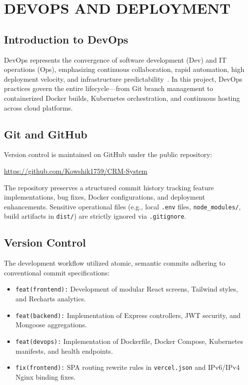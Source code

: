 \chapter{DEVOPS AND DEPLOYMENT}

\section{Introduction to DevOps}
DevOps represents the convergence of software development (Dev) and IT operations (Ops), emphasizing continuous collaboration, rapid automation, high deployment velocity, and infrastructure predictability~\cite{bass2015devops}. In this project, DevOps practices govern the entire lifecycle—from Git branch management to containerized Docker builds, Kubernetes orchestration, and continuous hosting across cloud platforms.

\section{Git and GitHub}
Version control is maintained on GitHub under the public repository:
\begin{center}
    \url{https://github.com/Kowshik1759/CRM-System}
\end{center}
The repository preserves a structured commit history tracking feature implementations, bug fixes, Docker configurations, and deployment enhancements. Sensitive operational files (e.g., local \texttt{.env} files, \texttt{node\_modules/}, build artifacts in \texttt{dist/}) are strictly ignored via \texttt{.gitignore}.

\section{Version Control}
The development workflow utilized atomic, semantic commits adhering to conventional commit specifications:
\begin{itemize}
    \item \texttt{feat(frontend):} Development of modular React screens, Tailwind styles, and Recharts analytics.
    \item \texttt{feat(backend):} Implementation of Express controllers, JWT security, and Mongoose aggregations.
    \item \texttt{feat(devops):} Implementation of Dockerfile, Docker Compose, Kubernetes manifests, and health endpoints.
    \item \texttt{fix(frontend):} SPA routing rewrite rules in \texttt{vercel.json} and IPv6/IPv4 Nginx binding fixes.
\end{itemize}

